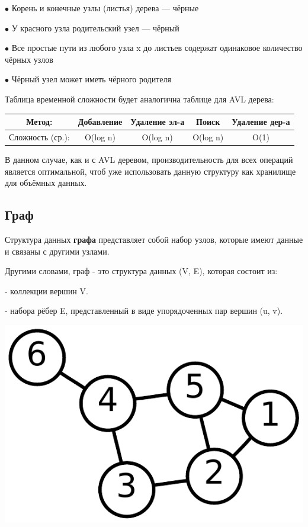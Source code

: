 \documentclass[utf8,14pt,a4paper,oneside,russian]{book}
\begin{document}
	$\bullet$ Корень и конечные узлы (листья) дерева — чёрные
	
	$\bullet$ У красного узла родительский узел — чёрный
	
	$\bullet$ Все простые пути из любого узла x до листьев содержат одинаковое количество чёрных узлов
	
	$\bullet$ Чёрный узел может иметь чёрного родителя
	
	Таблица временной сложности будет аналогична таблице для AVL дерева:
	
	\begin{longtable}{c|c|c|c|c}
		Метод: &Добавление&Удаление эл-а&Поиск&Удаление дер-а\\\hline
		Сложность (ср.): &O(log n)&O(log n)&O(log n)&O(1)\\
	\end{longtable}

	В данном случае, как и с AVL деревом, производительность для всех операций является оптимальной, чтоб уже использовать данную структуру как хранилище для объёмных данных.
	
	\subsection{Граф}
	
	Структура данных \textbf{графа} представляет собой набор узлов, которые имеют данные и связаны с другими узлами.
	
	Другими словами, граф - это структура данных (V, E), которая состоит из:
	
	- коллекции вершин V.
	
	- набора рёбер E, представленный в виде упорядоченных пар вершин (u, v).
	
	\begin{center}
		\includegraphics[scale=0.6]{graf}\\
	\end{center}
	
\end{document}
